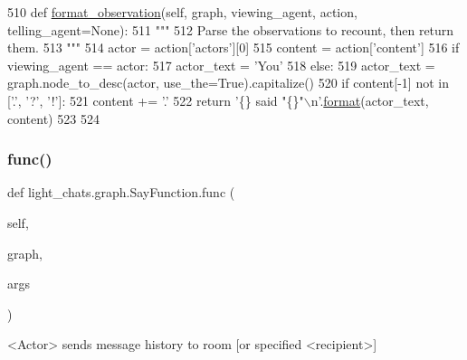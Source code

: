 \begin{DoxyCode}
510     \textcolor{keyword}{def }\hyperlink{namespacelight__chats_1_1graph_a6d359942394976812f0055affc289f56}{format\_observation}(self, graph, viewing\_agent, action, telling\_agent=None):
511         \textcolor{stringliteral}{"""}
512 \textcolor{stringliteral}{        Parse the observations to recount, then return them.}
513 \textcolor{stringliteral}{        """}
514         actor = action[\textcolor{stringliteral}{'actors'}][0]
515         content = action[\textcolor{stringliteral}{'content'}]
516         \textcolor{keywordflow}{if} viewing\_agent == actor:
517             actor\_text = \textcolor{stringliteral}{'You'}
518         \textcolor{keywordflow}{else}:
519             actor\_text = graph.node\_to\_desc(actor, use\_the=\textcolor{keyword}{True}).capitalize()
520         \textcolor{keywordflow}{if} content[-1] \textcolor{keywordflow}{not} \textcolor{keywordflow}{in} [\textcolor{stringliteral}{'.'}, \textcolor{stringliteral}{'?'}, \textcolor{stringliteral}{'!'}]:
521             content += \textcolor{stringliteral}{'.'}
522         \textcolor{keywordflow}{return} \textcolor{stringliteral}{'\{\} said "\{\}"\(\backslash\)n'}.\hyperlink{namespaceparlai_1_1chat__service_1_1services_1_1messenger_1_1shared__utils_a32e2e2022b824fbaf80c747160b52a76}{format}(actor\_text, content)
523 
524 
\end{DoxyCode}
\mbox{\label{classlight__chats_1_1graph_1_1SayFunction_af14fb1e5a036d9c537ea2915f2c76275}} 
\subsubsection{\texorpdfstring{func()}{func()}}
{\footnotesize\ttfamily def light\+\_\+chats.\+graph.\+Say\+Function.\+func (\begin{DoxyParamCaption}\item[{}]{self,  }\item[{}]{graph,  }\item[{}]{args }\end{DoxyParamCaption})}

\begin{DoxyVerb}<Actor> sends message history to room [or specified <recipient>]
\end{DoxyVerb}
 

